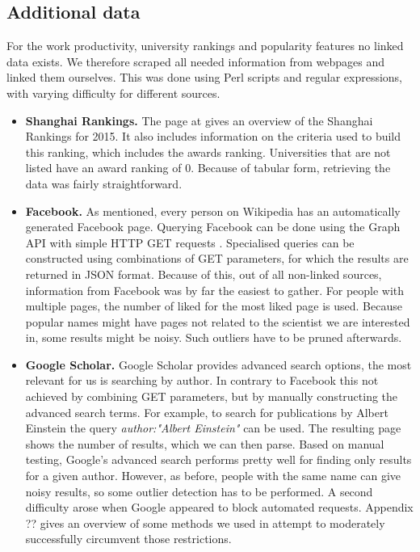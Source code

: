 \subsection{Additional data}
\label{ssec:additional}

For the work productivity, university rankings and popularity features no linked data exists. We therefore scraped all needed information from webpages and linked them ourselves. This was done using Perl scripts and regular expressions, with varying difficulty for different sources.

\begin{itemize}
\item{\textbf{Shanghai Rankings. }} 	
The page at \cite{rankings} gives an overview of the Shanghai Rankings for 2015. It also includes  information on the criteria used to build this ranking, which includes the awards ranking. Universities that are not listed have an award ranking of 0. Because of tabular form, retrieving the data was fairly straightforward.

\item{\textbf{Facebook. }} As mentioned, every person on Wikipedia has an automatically generated Facebook page. Querying Facebook can be done using the Graph API with simple HTTP GET requests \cite{graphAPI}. Specialised queries can be constructed using combinations of GET parameters, for which the results are returned in JSON format. Because of this, out of all non-linked sources, information from Facebook was by far the easiest to gather. For people with multiple pages, the number of liked for the most liked page is used. Because popular names might have pages not related to the scientist we are interested in, some results might be noisy. Such outliers have to be pruned afterwards.

\item{\textbf{Google Scholar. }} Google Scholar provides advanced search options, the most relevant for us is searching by author. In contrary to Facebook this not achieved by combining GET parameters, but by manually constructing the advanced search terms. For example, to search for publications by Albert Einstein the query  \emph{author:"Albert Einstein"} can be used. The resulting page shows the number of results, which we can then parse. Based on manual testing, Google's advanced search performs pretty well for finding only results for a given author. However, as before, people with the same name can give noisy results, so some outlier detection has to be performed. A second difficulty arose when Google appeared to block automated requests. Appendix ?? gives an overview of some methods we used in attempt to moderately successfully circumvent those restrictions.
\end{itemize}

